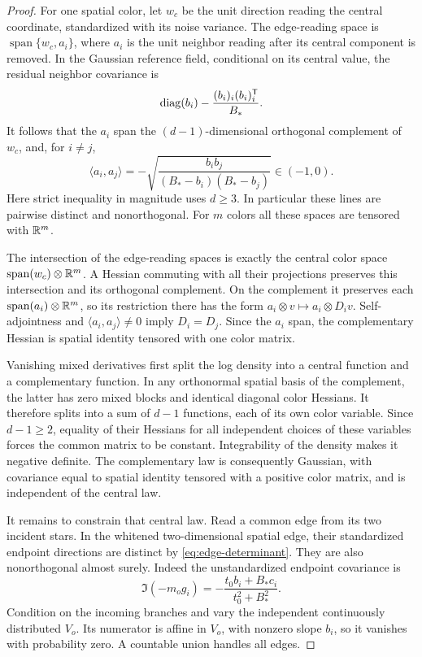 \begin{proof}
For one spatial color, let \(w_c\) be the unit direction
reading the central coordinate, standardized with its noise
variance.  The edge-reading space is
\(\operatorname{span}\{w_c,a_i\}\), where \(a_i\) is the unit
neighbor reading after its central component is removed.
In the Gaussian reference field, conditional on its central value,
the residual neighbor covariance is
\begin{equation}\label{eq:residual-neighbor-covariance}
 \operatorname{diag}(b_i)-\frac{(b_i)_i(b_i)_i^{\mathsf T}}{B_*}.
\end{equation}
It follows that the \(a_i\) span the \((d-1)\)-dimensional
orthogonal complement of \(w_c\), and, for \(i\ne j\),
\begin{equation}\label{eq:residual-directions}
 \langle a_i,a_j\rangle
 =-\sqrt{\frac{b_i b_j}{(B_*-b_i)(B_*-b_j)}}\in(-1,0).
\end{equation}
Here strict inequality in magnitude uses \(d\ge3\).
In particular these lines are pairwise distinct and
nonorthogonal.  For \(m\) colors all these spaces are
tensored with \(\mathbb R^m\).

The intersection of the edge-reading spaces is exactly the
central color space \(\operatorname{span}(w_c)\otimes\mathbb R^m\).
A Hessian commuting with all their projections preserves
this intersection and its orthogonal complement.  On the
complement it preserves each
\(\operatorname{span}(a_i)\otimes\mathbb R^m\), so its restriction
there has the form \(a_i\otimes v\mapsto a_i\otimes D_i v\).
Self-adjointness and \(\langle a_i,a_j\rangle\ne0\) imply
\(D_i=D_j\).  Since the \(a_i\) span, the complementary
Hessian is spatial identity tensored with one color matrix.

Vanishing mixed derivatives first split the log density into
a central function and a complementary function.  In any
orthonormal spatial basis of the complement, the latter has
zero mixed blocks and identical diagonal color Hessians.
It therefore splits into a sum of \(d-1\) functions, each of
its own color variable.  Since \(d-1\ge2\), equality of their
Hessians for all independent choices of these variables
forces the common matrix to be constant.  Integrability of
the density makes it negative definite.  The complementary
law is consequently Gaussian, with covariance equal to
spatial identity tensored with a positive color matrix, and
is independent of the central law.

It remains to constrain that central law.  Read a common edge
from its two incident stars.  In the whitened two-dimensional
spatial edge, their standardized endpoint directions are
distinct by \eqref{eq:edge-determinant}.  They are also
nonorthogonal almost surely.  Indeed the unstandardized endpoint
covariance is
\[
 \Im(-m_o g_i)
 =-\frac{t_0b_i+B_*c_i}{t_0^2+B_*^2}.
\]
Condition on the incoming branches and vary the independent
continuously distributed \(V_o\).  Its numerator is affine
in \(V_o\), with nonzero slope \(b_i\), so it vanishes with
probability zero.  A countable union handles all edges.


\end{proof}

